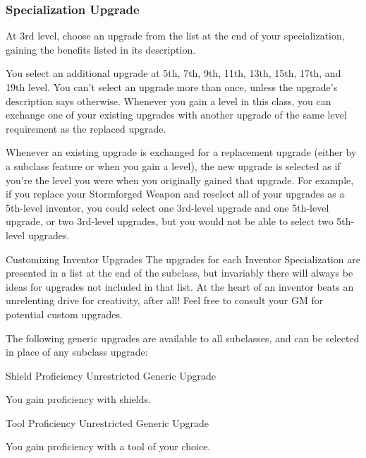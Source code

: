 \documentclass[11pt,twoside,openany]{book}  %
\begin{document}
\vspace{2.5em}
\begin{multicols}{2}
\subsubsection{Specialization Upgrade}

At 3rd level, choose an upgrade from the list at the end of your specialization, gaining the benefits listed in its description. 

You select an additional upgrade at 5th, 7th, 9th, 11th, 13th, 15th, 17th, and 19th level. You can’t select an upgrade more than once, unless the upgrade’s description says otherwise. Whenever you gain a level in this class, you can exchange one of your existing upgrades with another upgrade of the same level requirement as the replaced upgrade.

Whenever an existing upgrade is exchanged for a replacement upgrade (either by a subclass feature or when you gain a level), the new upgrade is selected as if you’re the level you were when you originally gained that upgrade. For example, if you replace your Stormforged Weapon and reselect all of your upgrades as a 5th-level inventor, you could select one 3rd-level upgrade and one 5th-level upgrade, or two 3rd-level upgrades, but you would not be able to select two 5th-level upgrades.
\begin{CalloutBox}{Customizing Inventor Upgrades}
The upgrades for each Inventor Specialization are presented in a list at the end of the subclass, but invariably there will always be ideas for upgrades not included in that list. At the heart of an inventor beats an unrelenting drive for creativity, after all! Feel free to consult your GM for potential custom upgrades.
\end{CalloutBox}
\end{multicols}
\newpage
\twocolumn
The following generic upgrades are available to all subclasses, and can be selected in place of any subclass upgrade:
\begin{fiveitemize}
	\item Shield Proficiency Unrestricted Generic Upgrade 
	\begin{fiveitemize}
		\item You gain proficiency with shields.
	\end{fiveitemize}
	\item Tool Proficiency Unrestricted Generic Upgrade 
	\begin{fiveitemize}
		\item You gain proficiency with a tool of your choice.
	\end{fiveitemize}
\end{fiveitemize}
\end{document}
